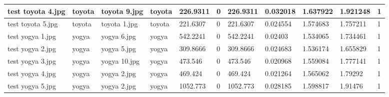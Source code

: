 \begin{landscape}
\begin{longtable}{|p{2cm}|p{1.5cm}|p{2cm}|p{1.5cm}|p{2cm}|p{1cm}|p{2cm}|p{2cm}|p{2cm}|p{2cm}|p{1cm}|}
		test toyota 4.jpg    & toyota           & toyota 9.jpg          & toyota                      & 226.9311              & 0                       & 226.9311                   & 0.032018              & 1.637922              & 1.921248                 & 1                \\ \hline
		test toyota 5.jpg    & toyota           & toyota 1.jpg          & toyota                      & 221.6307              & 0                       & 221.6307                   & 0.024554              & 1.574683              & 1.757211                 & 1                \\ \hline
		test yogya 1.jpg     & yogya            & yogya 6.jpg           & yogya                       & 542.2241              & 0                       & 542.2241                   & 0.02403               & 1.534065              & 1.734461                 & 1                \\ \hline
		test yogya 2.jpg     & yogya            & yogya 5.jpg           & yogya                       & 309.8666              & 0                       & 309.8666                   & 0.024683              & 1.536174              & 1.655829                 & 1                \\ \hline
		test yogya 3.jpg     & yogya            & yogya 10.jpg          & yogya                       & 473.546               & 0                       & 473.546                    & 0.020968              & 1.559084              & 1.777141                 & 1                \\ \hline
		test yogya 4.jpg     & yogya            & yogya 2.jpg           & yogya                       & 469.424               & 0                       & 469.424                    & 0.021264              & 1.565062              & 1.79292                  & 1                \\ \hline
		test yogya 5.jpg     & yogya            & yogya 2.jpg           & yogya                       & 1052.773              & 0                       & 1052.773                   & 0.028185              & 1.598817              & 1.91476                  & 1                \\ \hline
	\end{longtable}
\end{landscape}


